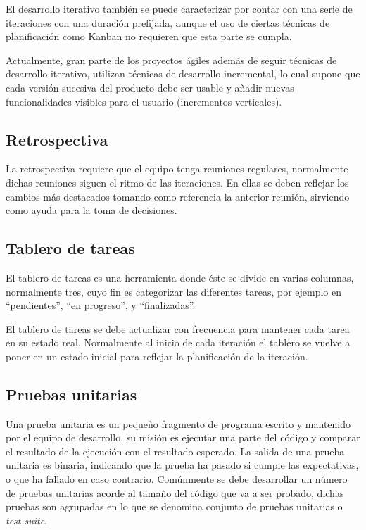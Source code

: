 El desarrollo iterativo también se puede caracterizar por contar con una serie de iteraciones con una duración prefijada, aunque el uso de ciertas técnicas de planificación como Kanban no requieren que esta parte se cumpla.

Actualmente, gran parte de los proyectos ágiles además de seguir técnicas de desarrollo iterativo, utilizan técnicas de desarrollo incremental, lo cual supone que cada versión sucesiva del producto debe ser usable y añadir nuevas funcionalidades visibles para el usuario (incrementos verticales).

\subsection{Retrospectiva}

La retrospectiva requiere que el equipo tenga reuniones regulares, normalmente dichas reuniones siguen el ritmo de las iteraciones. En ellas se deben reflejar los cambios más destacados tomando como referencia la anterior reunión, sirviendo como ayuda para la toma de decisiones.

\subsection{Tablero de tareas}

El tablero de tareas es una herramienta donde éste se divide en varias columnas, normalmente tres, cuyo fin es categorizar las diferentes tareas, por ejemplo en ``pendientes'', ``en progreso'', y ``finalizadas''.

El tablero de tareas se debe actualizar con frecuencia para mantener cada tarea en su estado real. Normalmente al inicio de cada iteración el tablero se vuelve a poner en un estado inicial para reflejar la planificación de la iteración.

\subsection{Pruebas unitarias}

Una prueba unitaria es un pequeño fragmento de programa escrito y mantenido por el equipo de desarrollo, su misión es ejecutar una parte del código y comparar el resultado de la ejecución con el resultado esperado. La salida de una prueba unitaria es binaria, indicando que la prueba ha pasado si cumple las expectativas, o que ha fallado en caso contrario. Comúnmente se debe desarrollar un número de pruebas unitarias acorde al tamaño del código que va a ser probado, dichas pruebas son agrupadas en lo que se denomina conjunto de pruebas unitarias o \emph{test suite}.

